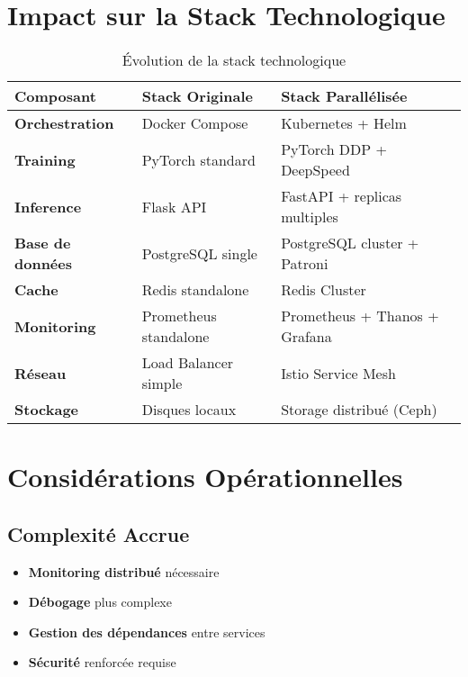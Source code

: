 \documentclass[12pt,a4paper]{article}
\begin{document}
\section{Impact sur la Stack Technologique}

\begin{table}[H]
\centering
\renewcommand{\arraystretch}{1.3}
\begin{tabular}{|p{4cm}|p{5cm}|p{5cm}|}
\hline
\textbf{Composant} & \textbf{Stack Originale} & \textbf{Stack Parallélisée} \\
\hline
\textbf{Orchestration} & Docker Compose & Kubernetes + Helm \\
\hline
\textbf{Training} & PyTorch standard & PyTorch DDP + DeepSpeed \\
\hline
\textbf{Inference} & Flask API & FastAPI + replicas multiples \\
\hline
\textbf{Base de données} & PostgreSQL single & PostgreSQL cluster + Patroni \\
\hline
\textbf{Cache} & Redis standalone & Redis Cluster \\
\hline
\textbf{Monitoring} & Prometheus standalone & Prometheus + Thanos + Grafana \\
\hline
\textbf{Réseau} & Load Balancer simple & Istio Service Mesh \\
\hline
\textbf{Stockage} & Disques locaux & Storage distribué (Ceph) \\
\hline
\end{tabular}
\caption{Évolution de la stack technologique}
\end{table}

\section{Considérations Opérationnelles}

\subsection{Complexité Accrue}
\begin{itemize}
\item \textbf{Monitoring distribué} nécessaire
\item \textbf{Débogage} plus complexe
\item \textbf{Gestion des dépendances} entre services
\item \textbf{Sécurité} renforcée requise
\end{itemize}
\end{document}
